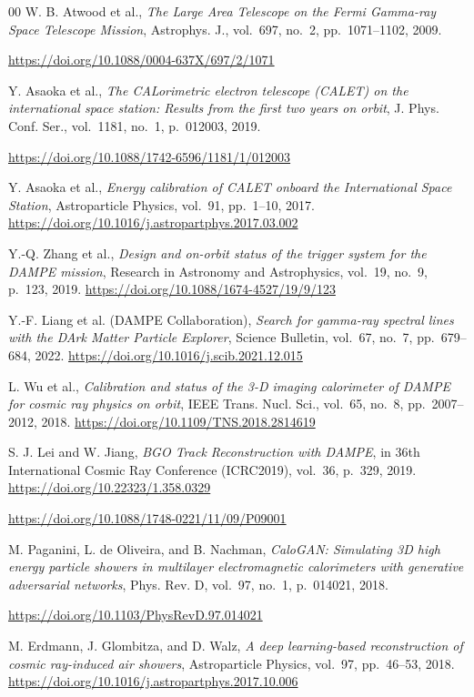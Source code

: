 \documentclass[preprint,12pt]{elsarticle}
\newcommand{\doi}[1]{\url{https://doi.org/#1}}
\begin{document}
\begin{thebibliography}{00}
  W. B. Atwood et al.,
  \textit{The Large Area Telescope on the Fermi Gamma-ray Space Telescope Mission},
  Astrophys. J., vol.~697, no.~2, pp.~1071--1102, 2009.

  \doi{10.1088/0004-637X/697/2/1071}

  Y. Asaoka et al.,
  \textit{The CALorimetric electron telescope (CALET) on the international space station: Results from the first two years on orbit},
  J. Phys. Conf. Ser., vol.~1181, no.~1, p.~012003, 2019.


  \doi{10.1088/1742-6596/1181/1/012003}

  Y. Asaoka et al.,
  \textit{Energy calibration of CALET onboard the International Space Station},
  Astroparticle Physics, vol.~91, pp.~1--10, 2017.
  \doi{10.1016/j.astropartphys.2017.03.002}

  Y.-Q. Zhang et al.,
  \textit{Design and on-orbit status of the trigger system for the DAMPE mission},
  Research in Astronomy and Astrophysics, vol.~19, no.~9, p.~123, 2019.
  \doi{10.1088/1674-4527/19/9/123}

  Y.-F. Liang et al. (DAMPE Collaboration),
  \textit{Search for gamma-ray spectral lines with the DArk Matter Particle Explorer},
  Science Bulletin, vol.~67, no.~7, pp.~679--684, 2022.
  \doi{10.1016/j.scib.2021.12.015}

  L. Wu et al.,
  \textit{Calibration and status of the 3-D imaging calorimeter of DAMPE for cosmic ray physics on orbit},
  IEEE Trans. Nucl. Sci., vol.~65, no.~8, pp.~2007--2012, 2018.
  \doi{10.1109/TNS.2018.2814619}

  S. J. Lei and W. Jiang,
  \textit{BGO Track Reconstruction with DAMPE},
  in 36th International Cosmic Ray Conference (ICRC2019), vol.~36, p.~329, 2019.
  \doi{10.22323/1.358.0329}


  \doi{10.1088/1748-0221/11/09/P09001}

  M. Paganini, L. de Oliveira, and B. Nachman,
  \textit{CaloGAN: Simulating 3D high energy particle showers in multilayer electromagnetic calorimeters with generative adversarial networks},
  Phys. Rev. D, vol.~97, no.~1, p.~014021, 2018.

  \doi{10.1103/PhysRevD.97.014021}

  M. Erdmann, J. Glombitza, and D. Walz,
  \textit{A deep learning-based reconstruction of cosmic ray-induced air showers},
  Astroparticle Physics, vol.~97, pp.~46--53, 2018.
  \doi{10.1016/j.astropartphys.2017.10.006}


\end{thebibliography}
\end{document}
